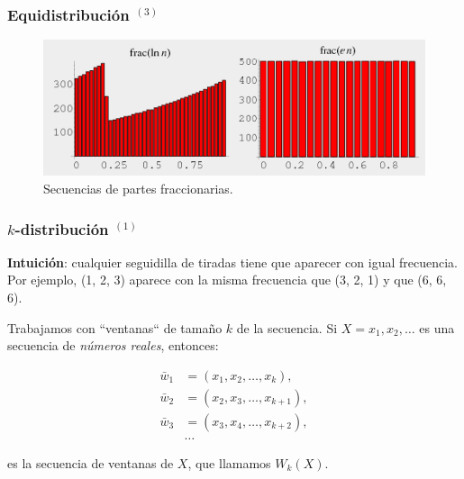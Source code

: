 \documentclass[t, 10pt, mathserif]{beamer}
\begin{document}

\begin{frame}
  \frametitle{Equidistribución {$^{(3)}$}}

  \vspace{1cm}
  \begin{figure}
    \includegraphics[scale=0.4]{resources/equidistribucion.png}
    \caption{Secuencias de partes fraccionarias.}
  \end{figure}
\end{frame}
 

\begin{frame}
  \frametitle{$k$-distribución {$^{(1)}$}}


  \textbf{Intuición}: cualquier seguidilla de tiradas tiene que aparecer con igual frecuencia. Por ejemplo, (1, 2, 3) aparece con la misma frecuencia que (3, 2, 1) y que (6, 6, 6).
  \pause

  Trabajamos con ``ventanas`` de tamaño $k$ de la secuencia. Si $X = x_1, x_2, \dots$ es una secuencia de \textit{números reales}, entonces:
  \pause

  \vspace{-0.3cm}
  \begin{equation*}
    \begin{aligned}
        \bar{w}_1 & = (x_1, x_2, \dots, x_k      ), \\
        \bar{w}_2 & = (x_2, x_3, \dots, x_{k + 1}), \\
        \bar{w}_3 & = (x_3, x_4, \dots, x_{k + 2}), \\
            & \dots
    \end{aligned}
  \end{equation*}

  es la secuencia de ventanas de $X$, que llamamos $W_k(X)$.
\end{frame}
\end{document}
